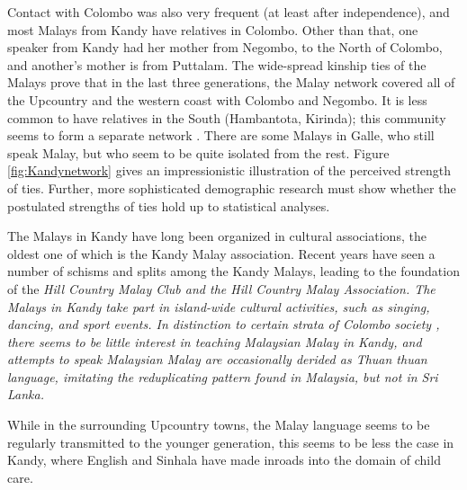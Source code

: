 Contact with Colombo was also very frequent (at least after independence), and most Malays from Kandy have relatives in Colombo. Other than that, one speaker from Kandy had her mother from Negombo, to the North of Colombo, and  another's mother is from Puttalam. The wide-spread kinship ties of the Malays prove that in the last three generations, the Malay network covered all of the Upcountry and the western coast with Colombo and Negombo. It is less common to have relatives in the South (Hambantota, Kirinda); this community seems to form a separate network \citep{AnsaldoEtAl2006fel,LimEtAl2007}. There are some Malays in Galle, who still speak Malay, but who seem to be quite isolated from the rest. Figure \ref{fig:Kandynetwork} gives an impressionistic illustration of the perceived strength of ties. Further, more sophisticated demographic research must show whether the postulated strengths of ties hold up to statistical analyses.


The Malays in Kandy have long been organized in cultural associations, the oldest one of which is the Kandy Malay association. Recent years have seen a number of schisms and splits among the Kandy Malays, leading to the foundation of the \em Hill Country Malay Club \em and the \em Hill Country Malay Association\em. The Malays in Kandy take part in island-wide cultural activities, such as singing, dancing, and sport events. In distinction to certain strata of Colombo society \citep{AnsaldoEtAl2006fel,LimEtAl2006aclcwp}, there seems to be little interest in teaching Malaysian Malay in Kandy, and attempts to speak Malaysian Malay are occasionally derided as \em Thuan thuan language\em, imitating the reduplicating pattern found in Malaysia, but not in Sri Lanka.

While in the surrounding Upcountry towns, the Malay language seems to be regularly transmitted to the younger generation, this seems to be less the case in Kandy, where English and Sinhala have made inroads into the domain of child care.


